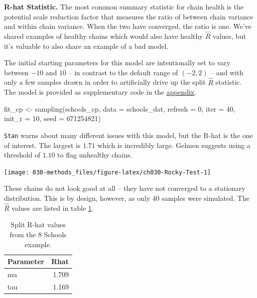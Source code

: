 \documentclass[11pt, oneside, openany]{scrbook}
\newenvironment{Shaded}{\begin{snugshade}}{\end{snugshade}}
\newcommand{\AttributeTok}[1]{\textcolor[rgb]{0.77,0.63,0.00}{#1}}
\newcommand{\DecValTok}[1]{\textcolor[rgb]{0.00,0.00,0.81}{#1}}
\newcommand{\FunctionTok}[1]{\textcolor[rgb]{0.00,0.00,0.00}{#1}}
\newcommand{\NormalTok}[1]{#1}
\newcommand{\OtherTok}[1]{\textcolor[rgb]{0.56,0.35,0.01}{#1}}
\begin{document}
\textbf{R-hat Statistic.} The most common summary statistic for chain health is the potential scale reduction factor \citep{gelman1992inference} that measures the ratio of between chain variance and within chain variance. When the two have converged, the ratio is one. We've shared examples of healthy chains which would also have healthy \(\hat{R}\) values, but it's valuable to also share an example of a bad model.

The initial starting parameters for this model are intentionally set to vary between \(-10\) and \(10\) -- in contrast to the default range of \((-2, 2)\) -- and with only a few samples drawn in order to artificially drive up the split \(\hat{R}\) statistic. The model is provided as supplementary code in the \protect\hyperlink{code}{appendix}.


\begin{Shaded}
\begin{Highlighting}[]
\NormalTok{fit\_cp }\OtherTok{\textless{}{-}} \FunctionTok{sampling}\NormalTok{(schools\_cp, }\AttributeTok{data =}\NormalTok{ schools\_dat, }\AttributeTok{refresh =} \DecValTok{0}\NormalTok{,}
                   \AttributeTok{iter =} \DecValTok{40}\NormalTok{, }\AttributeTok{init\_r =} \DecValTok{10}\NormalTok{, }\AttributeTok{seed =} \DecValTok{671254821}\NormalTok{)}
\end{Highlighting}
\end{Shaded}


\texttt{Stan} warns about many different issues with this model, but the R-hat is the one of interest. The largest is \(1.71\) which is incredibly large. Gelmen suggests using a threshold of \(1.10\) to flag unhealthy chains.

\begin{center}\texttt{[image: 030-methods\_files/figure-latex/ch030-Rocky-Test-1]} \end{center}

These chains do not look good at all -- they have not converged to a stationary distribution. This is by design, however, as only 40 samples were simulated. The \(\hat{R}\) values are listed in table \ref{tab:ch030-Ninth-Finger}.

\begin{table}[!h]

\caption{\label{tab:ch030-Ninth-Finger}Split R-hat values from the 8 Schools example.}
\centering
\begin{tabular}[t]{lr}
\toprule
Parameter & Rhat\\
\midrule
mu & 1.709\\
tau & 1.169\\
\bottomrule
\end{tabular}
\end{table}
\end{document}
